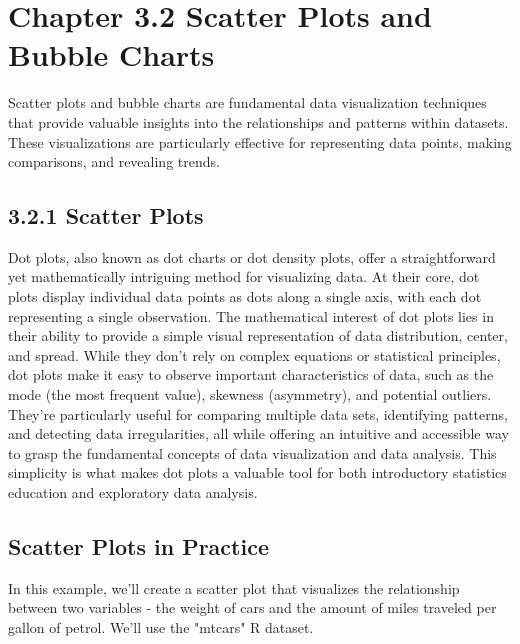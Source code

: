 \documentclass{article}\usepackage[]{graphicx}\usepackage[]{xcolor}
\begin{document}
\section{Chapter 3.2 Scatter Plots and Bubble Charts}
Scatter plots and bubble charts are fundamental data visualization techniques that provide valuable insights into the relationships and patterns within datasets. These visualizations are particularly effective for representing data points, making comparisons, and revealing trends.

\subsection{3.2.1 Scatter Plots}
Dot plots, also known as dot charts or dot density plots, offer a straightforward yet mathematically intriguing method for visualizing data. At their core, dot plots display individual data points as dots along a single axis, with each dot representing a single observation. The mathematical interest of dot plots lies in their ability to provide a simple visual representation of data distribution, center, and spread. While they don't rely on complex equations or statistical principles, dot plots make it easy to observe important characteristics of data, such as the mode (the most frequent value), skewness (asymmetry), and potential outliers. They're particularly useful for comparing multiple data sets, identifying patterns, and detecting data irregularities, all while offering an intuitive and accessible way to grasp the fundamental concepts of data visualization and data analysis. This simplicity is what makes dot plots a valuable tool for both introductory statistics education and exploratory data analysis.

\subsection{Scatter Plots in Practice}
In this example, we'll create a scatter plot that visualizes the relationship between two variables - the weight of cars and the amount of miles traveled per gallon of petrol. We'll use the "mtcars" R dataset.
\end{document}
